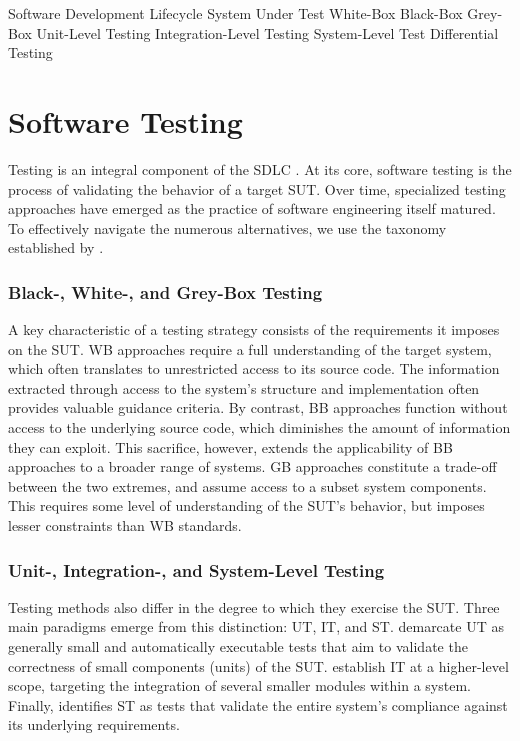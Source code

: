  {Software Development Lifecycle}
 {System Under Test}
 {White-Box}
 {Black-Box}
 {Grey-Box}
 {Unit-Level Testing}
 {Integration-Level Testing}
 {System-Level Test}
 {Differential Testing}

\section{Software Testing}

Testing is an integral component of the \gls{SDLC} \cite{jamil2016software}.
At its core, software testing is the process of validating
the behavior of a target \gls{SUT}. 
Over time, specialized testing approaches have emerged as
the practice of software engineering itself matured.
To effectively navigate the numerous alternatives, we use the
taxonomy established by \citet{umar2020comprehensive}.

\subsubsection{Black-, White-, and Grey-Box Testing}

A key characteristic of a testing strategy consists of 
the requirements it imposes on the \gls{SUT}. 
\Gls{WB} approaches require a full understanding of the target
system, which often translates to unrestricted access to its source code.
The information extracted through access to the system's structure
and implementation often provides valuable guidance criteria.
By contrast, \Gls{BB} approaches function without access to the underlying
source code, which diminishes the amount of information they can exploit.
This sacrifice, however, extends the applicability of \gls{BB} approaches 
to a broader range of systems.
\Gls{GB} approaches constitute a trade-off between the two 
extremes, and assume access to a subset system components.
This requires some level of understanding of the \gls{SUT}'s
behavior, but imposes lesser constraints than \gls{WB} standards.

\subsubsection{Unit-, Integration-, and System-Level Testing}

Testing methods also differ in the degree to which they exercise the \gls{SUT}.
Three main paradigms emerge from this distinction: 
\Gls{UT}, \Gls{IT}, and \gls{ST}.
\citet{daka2014survey} demarcate \gls{UT} as 
generally small and automatically executable tests that aim
to validate the correctness of small components (units) of the \gls{SUT}.
\citet{leung1990study} establish \gls{IT} at a higher-level scope, targeting
the integration of several smaller modules within a system.
Finally, \citet{umar2020comprehensive} identifies \gls{ST} as tests
that validate the entire system's compliance against its underlying
requirements.

